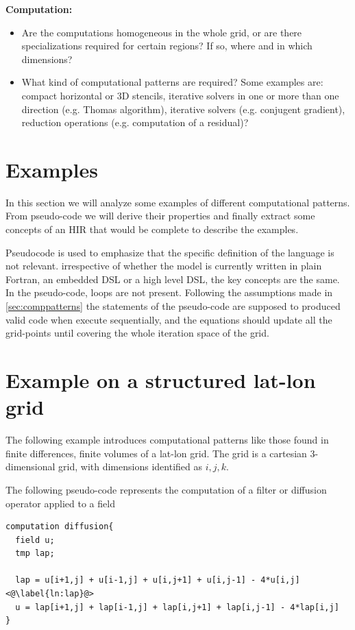 \documentclass[a4paper,10pt]{scrartcl}
\begin{document}
\textbf{Computation:}\newline
\begin{itemize}
  \item Are the computations homogeneous in the whole grid, or are there specializations required for certain regions? If so, where and in which dimensions?
  \item What kind of computational patterns are required? Some examples are: compact horizontal or 3D stencils, iterative solvers in one or more than one direction (e.g. Thomas algorithm), iterative solvers (e.g. conjugent gradient), reduction operations (e.g. computation of a residual)?
\end{itemize}


\section{Examples}
In this section we will analyze some examples of different computational patterns. From pseudo-code we will derive their properties and finally extract some concepts of an HIR that would be complete to describe the examples.
 
Pseudocode is used to emphasize that the specific definition of the language is not relevant.
irrespective of whether the model is currently written in plain Fortran, an embedded DSL or a high level DSL, the key concepts are the same.
In the pseudo-code, loops are not present. Following the assumptions made in \cref{sec:comppatterns} the statements of the pseudo-code are supposed to produced valid code when execute sequentially, and the equations should update all the grid-points until covering the whole iteration space of the grid. 

\section{Example on a structured lat-lon grid}
The following example introduces computational patterns like those found in finite differences, finite volumes of a lat-lon grid. The grid is a cartesian 3-dimensional grid, with dimensions identified as $i,j,k$.

The following pseudo-code represents the computation of a filter or diffusion operator applied to a field

\begin{lstlisting}[label=lst:diff, caption=pseudo-code for a diffusion operator example]
computation diffusion{
  field u; 
  tmp lap;

  lap = u[i+1,j] + u[i-1,j] + u[i,j+1] + u[i,j-1] - 4*u[i,j] <@\label{ln:lap}@>
  u = lap[i+1,j] + lap[i-1,j] + lap[i,j+1] + lap[i,j-1] - 4*lap[i,j]
}
\end{lstlisting}
\end{document}

